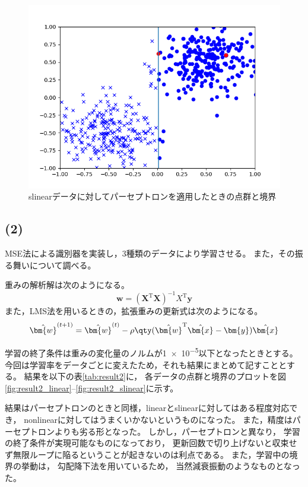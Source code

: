 \documentclass[class=jsarticle, crop=false, dvipdfmx, fleqn]{standalone}
\begin{document}
\begin{figure}
    \centering
    \includegraphics[clip, width=12cm]{../figures/assignment1_1_slinear_result}
    \caption{slinearデータに対してパーセプトロンを適用したときの点群と境界}
    \label{fig:result1_slinear}
\end{figure}



\clearpage
\subsection*{(2)}

MSE法による識別器を実装し，3種類のデータにより学習させる。
また，その振る舞いについて調べる。

重みの解析解は次のようになる。
\begin{equation}
    \bm{w} = (\bm{X}^\mathrm{T} \bm{X})^{-1} X^\mathrm{T} \bm{y}
\end{equation}
また，LMS法を用いるときの，拡張重みの更新式は次のようになる。
\begin{equation}
    \hat{\bm{w}}^{(t+1)} = \hat{\bm{w}}^{(t)} - \rho \qty(\hat{\bm{w}}^\mathrm{T} \hat{\bm{x}} - \bm{y}) \hat{\bm{x}}
\end{equation}

学習の終了条件は重みの変化量のノルムが\num{1e-5}以下となったときとする。
今回は学習率をデータごとに変えたため，それも結果にまとめて記すこととする。
結果を以下の表\ref{tab:result2}に，
各データの点群と境界のプロットを図\ref{fig:result2_linear}--\ref{fig:result2_slinear}に示す。

結果はパーセプトロンのときと同様，linearとslinearに対してはある程度対応でき，
nonlinearに対してはうまくいかないというものになった。
また，精度はパーセプトロンよりも劣る形となった。
しかし，パーセプトロンと異なり，
学習の終了条件が実現可能なものになっており，
更新回数で切り上げないと収束せず無限ループに陥るということが起きないのは利点である。
また，学習中の境界の挙動は，
勾配降下法を用いているため，
当然減衰振動のようなものとなった。
\end{document}
